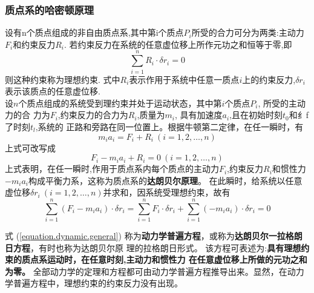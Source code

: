 \documentclass{book}
\begin{document}
\subsubsection{质点系的哈密顿原理}
设有n个质点组成的非自由质点系,其中第i个质点$P_i$所受的合力可分为两类:主动力$F_i$和约束反力$R_i$. 若约束反力在系统的任意虚位移上所作元功之和恒等于零,即
\begin{equation}
\sum_{i=1}^n R_i \cdot \delta r_i =0
\end{equation}
则这种约束称为理想约束. 式中$R_i$表示作用于系统中任意一质点$i$上的约束反力,$\delta r_i$表示该质点的任意虚位移.  \\
设$n$个质点组成的系统受到理约束并处于运动状态，其中第$i$个质点$P_i$, 所受的主动力的合 力为$F_i$,约束反力的合力为$R_i$,质量为$m_i$,
具有加速度$a_i$,且在初始时刻$t_0$和纟f 了时刻$t_l$,系统的 正路和旁路在同一位置上。根据牛顿第二定律，在任一瞬时，有
\begin{equation}
 m_i a_i = F_i + R_i  ~(i=1,2,\ldots,n)
\end{equation}
上式可改写成
\begin{equation}
   F_i- m_i a_i + R_i =0 ~(i=1,2,\ldots,n)
\end{equation}
上式表明，在任一瞬时,作用于质点系内每个质点的主动力$F_i$,约束反力$R_i$和惯性力$-m_ia_i$构成平衡力系，这称为质点系的\textbf{达朗贝尔原理}。
在此瞬时，给系统以任意虚位移$\delta r_i ~ (i=1,2,\ldots,n)$并求和，因系统受理想约束，故有
\begin{equation}
 \sum_{i=1}^n(F_i - m_i a_i)\cdot \delta r_i =\sum_{i=1}^nF_i \cdot \delta r_i +\sum_{i=1}^n(- m_i a_i)\cdot \delta r_i=0
 \label{equation.dynamic.general}
\end{equation}

式 (\ref{equation.dynamic.general})
称为\textbf{动力学普遍方程}，或称为\textbf{达朗贝尔一拉格朗日方程}，有时也称为达朗贝尔原 理的拉格朗日形式。
该方程可表述为:\textbf{具有理想约束的质点系运动时，在任意时刻,主动力和惯性力 在任意虚位移上所做的元功之和为零。}
全部动力学的定理和方程都可由动力学普遍方程推导出来。显然，在动力学普遍方程中，理想约束的约束反力没有出现。
\end{document}
